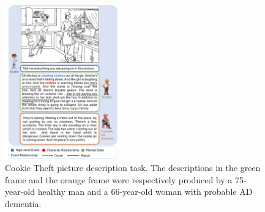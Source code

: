 \begin{figure}[ht]
\centering
\includegraphics[width=0.44\textwidth]{figs/cookie_theft_description12.pdf}
\caption{Cookie Theft picture description task. 
    The descriptions in the green frame and the orange frame were respectively produced by a 75-year-old healthy man and a 66-year-old woman with probable AD dementia\protect\footnotemark. 
    }
\label{fig:cookie_theft}
\end{figure}






    
